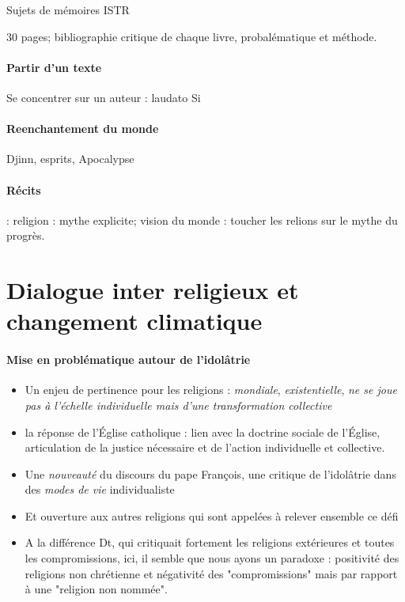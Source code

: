 {Sujets de mémoires ISTR}

30 pages;
bibliographie critique de chaque livre, probalématique et méthode.



\paragraph{Partir d'un texte} 
Se concentrer sur un auteur : laudato Si

\paragraph{Reenchantement du monde}
 Djinn, esprits, Apocalypse

\paragraph{Récits}
 : religion : mythe explicite; vision du monde : toucher les relions sur le mythe du progrès. 


\section{Dialogue inter religieux et changement climatique}

\paragraph{Mise en problématique autour de l'idolâtrie}
\begin{itemize}
    \item Un enjeu de pertinence pour les religions : \textit{mondiale}, \textit{existentielle}, \textit{ne se joue pas à l'échelle individuelle mais d'une transformation collective}
    \item la réponse de l'Église catholique : lien avec la doctrine sociale de l'Église, articulation de la justice nécessaire et de l'action individuelle et collective. 
    \item Une \textit{nouveauté} du discours du pape François, une critique de l'idolâtrie dans des \textit{modes de vie} individualiste
    \item Et ouverture aux autres religions qui sont appelées à relever ensemble ce défi
    \item A la différence Dt, qui critiquait fortement les religions extérieures et toutes les compromissions, ici, il semble que nous ayons un paradoxe : positivité des religions non chrétienne et négativité des "compromissions" mais par rapport à une "religion non nommée".
  
\end{itemize}


